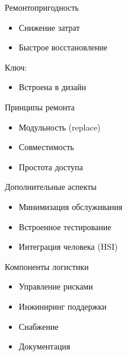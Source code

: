 \documentclass{beamer}
\begin{document}

\begin{frame}{Ремонтопригодность}
\begin{itemize}
    \item Снижение затрат
    \item Быстрое восстановление
\end{itemize}

\vspace{0.5cm}

Ключ:
\begin{itemize}
    \item Встроена в дизайн
\end{itemize}

\end{frame}


\begin{frame}{Принципы ремонта}
\begin{itemize}
    \item Модульность (replace)
    \item Совместимость
    \item Простота доступа
\end{itemize}

\end{frame}


\begin{frame}{Дополнительные аспекты}
\begin{itemize}
    \item Минимизация обслуживания
    \item Встроенное тестирование
    \item Интеграция человека (HSI)
\end{itemize}

\end{frame}


\begin{frame}{Компоненты логистики}
\begin{itemize}
    \item Управление рисками
    \item Инжиниринг поддержки
    \item Снабжение
    \item Документация
\end{itemize}

\end{frame}
\end{document}
